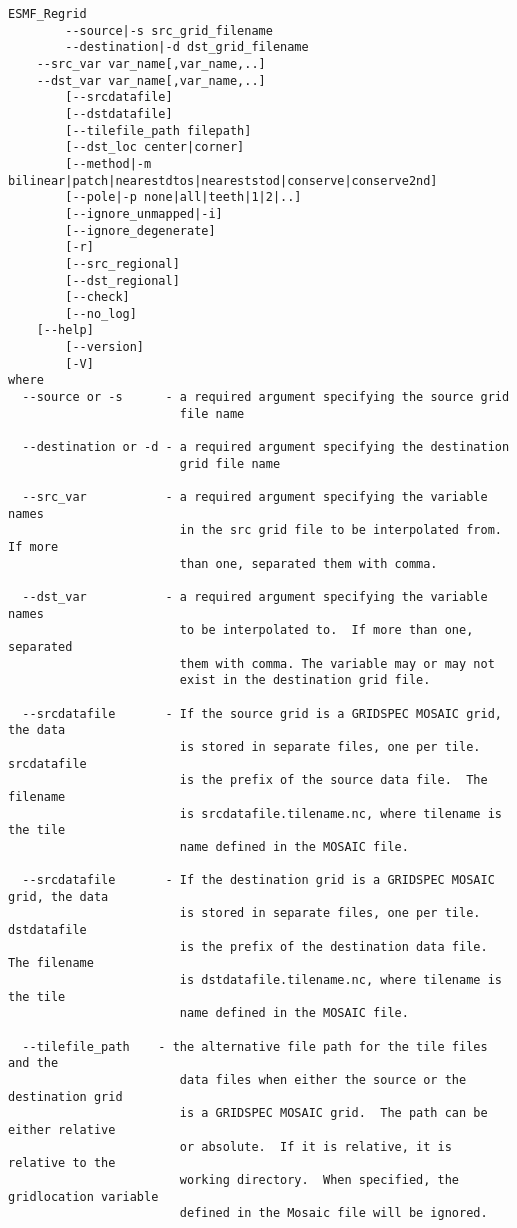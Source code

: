 \begin{verbatim}
ESMF_Regrid  
        --source|-s src_grid_filename
        --destination|-d dst_grid_filename
	--src_var var_name[,var_name,..]
	--dst_var var_name[,var_name,..]
        [--srcdatafile]
        [--dstdatafile]
        [--tilefile_path filepath]
        [--dst_loc center|corner]
        [--method|-m bilinear|patch|nearestdtos|neareststod|conserve|conserve2nd]
        [--pole|-p none|all|teeth|1|2|..]
        [--ignore_unmapped|-i]
        [--ignore_degenerate]
        [-r]
        [--src_regional]
        [--dst_regional]
        [--check]
        [--no_log]
	[--help]
        [--version]
        [-V]
where
  --source or -s      - a required argument specifying the source grid
                        file name

  --destination or -d - a required argument specifying the destination
                        grid file name

  --src_var           - a required argument specifying the variable names 
                        in the src grid file to be interpolated from.  If more
                        than one, separated them with comma.

  --dst_var           - a required argument specifying the variable names 
                        to be interpolated to.  If more than one, separated 
                        them with comma. The variable may or may not 
                        exist in the destination grid file.

  --srcdatafile       - If the source grid is a GRIDSPEC MOSAIC grid, the data 
                        is stored in separate files, one per tile. srcdatafile
                        is the prefix of the source data file.  The filename
                        is srcdatafile.tilename.nc, where tilename is the tile 
                        name defined in the MOSAIC file.

  --srcdatafile       - If the destination grid is a GRIDSPEC MOSAIC grid, the data 
                        is stored in separate files, one per tile. dstdatafile
                        is the prefix of the destination data file.  The filename
                        is dstdatafile.tilename.nc, where tilename is the tile 
                        name defined in the MOSAIC file.

  --tilefile_path    - the alternative file path for the tile files and the
                        data files when either the source or the destination grid
                        is a GRIDSPEC MOSAIC grid.  The path can be either relative
                        or absolute.  If it is relative, it is relative to the
                        working directory.  When specified, the gridlocation variable
                        defined in the Mosaic file will be ignored. 


\end{verbatim}
